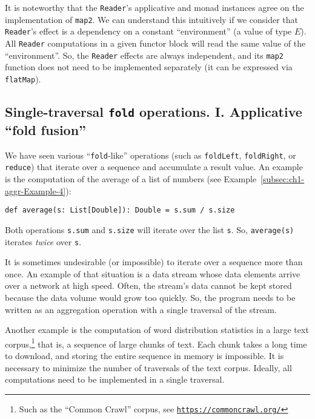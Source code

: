 It is noteworthy that the \lstinline!Reader!\textsf{'}s applicative and monad
instances agree on the implementation of \lstinline!map2!. We can
understand this intuitively if we consider that \lstinline!Reader!\textsf{'}s
effect is a dependency on a constant \textsf{``}environment\textsf{''} (a value of
type $E$). All \lstinline!Reader! computations in a given functor
block will read the same value of the \textsf{``}environment\textsf{''}. So, the \lstinline!Reader!
effects are always independent, and its \lstinline!map2! function
does not need to be implemented separately (it can be expressed via
\lstinline!flatMap!).

\subsection{Single-traversal \texttt{fold} operations. I. Applicative \textquotedblleft fold
fusion\textquotedblright\label{subsec:Single-traversal-fold-operations-applicative-fold-fusion}}

We have seen various \textsf{``}\lstinline!fold!-like\textsf{''} operations (such
as \lstinline!foldLeft!, \lstinline!foldRight!, or \lstinline!reduce!)
that iterate over a sequence and accumulate a result value. An example
is the computation of the average of a list of numbers (see Example~\ref{subsec:ch1-aggr-Example-4}):
\begin{lstlisting}
def average(s: List[Double]): Double = s.sum / s.size
\end{lstlisting}
Both operations \lstinline!s.sum! and \lstinline!s.size! will iterate
over the list \lstinline!s!. So, \lstinline!average(s)! iterates
\emph{twice} over \lstinline!s!.

It is sometimes undesirable (or impossible) to iterate over a sequence
more than once. An example of that situation is a data stream whose
data elements arrive over a network at high speed. Often, the stream\textsf{'}s
data cannot be kept stored because the data volume would grow too
quickly. So, the program needs to be written as an aggregation
operation with a single traversal of the stream. 

Another example is the computation of word distribution statistics
in a large text corpus,\footnote{Such as the \textsf{``}Common Crawl\textsf{''} corpus, see \texttt{\href{https://commoncrawl.org/}{https://commoncrawl.org/}}}
that is, a sequence of large chunks of text. Each chunk takes a long
time to download, and storing the entire sequence in memory is impossible.
It is necessary to minimize the number of traversals of the text corpus.
Ideally, all computations need to be implemented in a single traversal.

